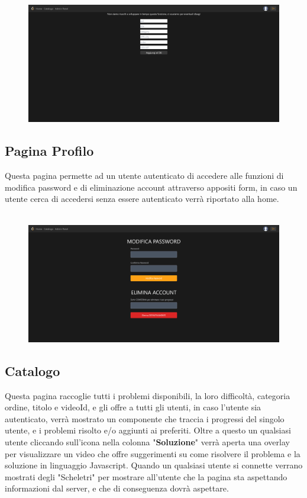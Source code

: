 \documentclass[11pt, a4paper]{article}
\theoremstyle{definition}
\begin{document}
\begin{figure}[H]
  \centering
  \includegraphics[width=\textwidth]{materiale/sito/Pannello Admin.png}
\end{figure}

\subsection{Pagina Profilo}
Questa pagina permette ad un utente autenticato di accedere alle funzioni di modifica password e di eliminazione account attraverso appositi form, in caso un utente cerca di accedersi senza essere autenticato verrà riportato alla home.\\\\

\begin{figure}[H]
  \centering
  \includegraphics[width=\textwidth]{materiale/sito/Pagina Profilo.png}
\end{figure}

\subsection{Catalogo}
Questa pagina raccoglie tutti i problemi disponibili, la loro difficoltà, categoria
ordine, titolo e videoId, e gli offre a tutti gli utenti, in caso l'utente sia autenticato, verrà mostrato un componente
 che traccia i progressi del singolo utente, e i problemi risolto e/o aggiunti ai preferiti. Oltre a questo un qualsiasi
utente cliccando sull'icona nella colonna "\textbf{Soluzione}" verrà aperta una overlay per visualizzare un video che offre suggerimenti su come risolvere il problema e la soluzione in linguaggio Javascript.
Quando un qualsiasi utente si connette verrano mostrati degli "Scheletri" per mostrare all'utente che la pagina sta aspettando informazioni dal server, e che di conseguenza dovrà aspettare.\\\\
\end{document}
